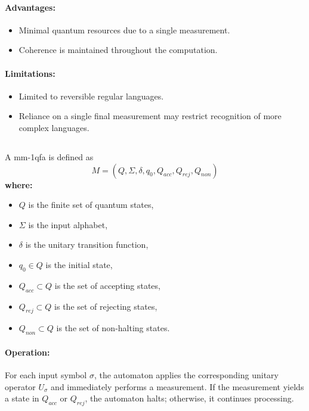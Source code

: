 \paragraph{Advantages:}
\begin{itemize}
    \item Minimal quantum resources due to a single measurement.
    \item Coherence is maintained throughout the computation.
\end{itemize}

\paragraph{Limitations:}
\begin{itemize}
    \item Limited to reversible regular languages.
    \item Reliance on a single final measurement may restrict recognition of more complex languages.
\end{itemize}

\subsection{}
\label{subsec:mm-1qfa}
\begin{definition}
A \gls{mm-1qfa} is defined as 
\[
M = (Q, \Sigma, \delta, q_0, Q_{acc}, Q_{rej}, Q_{non})
\]
\textbf{where:}
\begin{itemize}
    \item \( Q \) is the finite set of quantum states,
    \item \( \Sigma \) is the input alphabet,
    \item \( \delta \) is the unitary transition function,
    \item \( q_0 \in Q \) is the initial state,
    \item \( Q_{acc} \subset Q \) is the set of accepting states,
    \item \( Q_{rej} \subset Q \) is the set of rejecting states,
    \item \( Q_{non} \subset Q \) is the set of non-halting states.
\end{itemize}
\end{definition}

\paragraph{Operation:}  
For each input symbol \( \sigma \), the automaton applies the corresponding unitary operator \( U_\sigma \) and immediately performs a measurement. If the measurement yields a state in \( Q_{acc} \) or \( Q_{rej} \), the automaton halts; otherwise, it continues processing.

